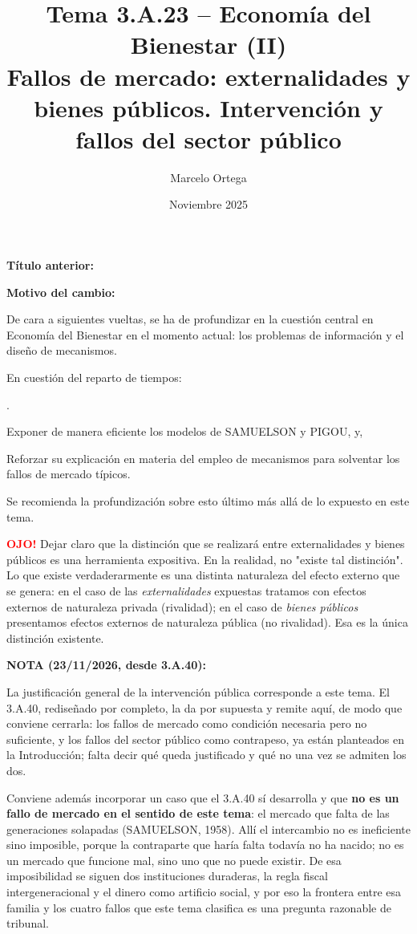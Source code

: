 \documentclass[10pt,a4paper]{article}
\title{Tema 3.A.23 -- Economía del Bienestar (II)\\
\large Fallos de mercado: externalidades y bienes públicos. Intervención y fallos del sector público}
\author{Marcelo Ortega}
\date{Noviembre 2025}
\newcounter{numitem}
\newcommand{\puntosclave}[1]{%
  \begin{tcolorbox}[
    colframe=black,
    title={Puntos clave},
    before upper={\setlength{\parindent}{0.5cm}\setlength{\parskip}{0.5\baselineskip}}
  ]
  #1
  \end{tcolorbox}
}
\newcommand{\modificaciones}[1]{
  \begin{tcolorbox}[
    colback=white,
    colframe=red,
    title={Modificaciones a realizar},
    before upper={\setlength{\parindent}{0.5cm}\setlength{\parskip}{0.5\baselineskip}}
  ]
  #1
  \end{tcolorbox}
}
\newenvironment{lnum}
      {\begin{list}{\arabic{numitem}.}{%
          \usecounter{numitem}%
          \setlength{\leftmargin}{1cm}%
          \setlength{\parskip}{3pt}%
          \setlength{\itemsep}{0pt}%
          \setlength{\parsep}{0pt}%
      }}
      {\end{list}}
\newcommand{\changebox}{%
\begin{tcolorbox}[title={Historial de cambios del tema}]
\textbf{Título anterior:} \OldTitle\par
\textbf{Motivo del cambio:} \ChangeWhy
\end{tcolorbox}
}
\newcommand{\authorfont}[1]{{\fontfamily{EBGaramond-TLF}\selectfont #1}}
\begin{document}
\maketitle
\changebox

\newpage

\puntosclave{
    De cara a siguientes vueltas, se ha de profundizar en la cuestión central en Economía del Bienestar en el momento actual: los problemas de información y el diseño de mecanismos.
    
    En cuestión del reparto de tiempos:
    \begin{lnum}
        \item Exponer de manera eficiente los modelos de \authorfont{SAMUELSON y \authorfont{PIGOU}}, y,
        \item Reforzar su explicación en materia del empleo de mecanismos para solventar los fallos de mercado típicos.
    \end{lnum}
    
    Se recomienda la profundización sobre esto último más allá de lo expuesto en este tema.

    \textcolor{red}{\textbf{OJO!}} Dejar claro que la distinción que se realizará entre externalidades y bienes públicos es una herramienta expositiva. En la realidad, no "existe tal distinción". Lo que existe verdaderarmente es una distinta naturaleza del efecto externo que se genera: en el caso de las \textit{externalidades} expuestas tratamos con efectos externos de naturaleza privada (rivalidad); en el caso de \textit{bienes públicos} presentamos efectos externos de naturaleza pública (no rivalidad). Esa es la única distinción existente. 
    
    }
\vspace{1cm}
\modificaciones{
    \textbf{NOTA (23/11/2026, desde 3.A.40):} {\color{magenta}La justificación general de la intervención pública corresponde a este tema. El 3.A.40, rediseñado por completo, la da por supuesta y remite aquí, de modo que conviene cerrarla: los fallos de mercado como condición necesaria pero no suficiente, y los fallos del sector público como contrapeso, ya están planteados en la Introducción; falta decir qué queda justificado y qué no una vez se admiten los dos.

    Conviene además incorporar un caso que el 3.A.40 sí desarrolla y que \textbf{no es un fallo de mercado en el sentido de este tema}: el mercado que falta de las generaciones solapadas (SAMUELSON, 1958). Allí el intercambio no es ineficiente sino imposible, porque la contraparte que haría falta todavía no ha nacido; no es un mercado que funcione mal, sino uno que no puede existir. De esa imposibilidad se siguen dos instituciones duraderas, la regla fiscal intergeneracional y el dinero como artificio social, y por eso la frontera entre esa familia y los cuatro fallos que este tema clasifica es una pregunta razonable de tribunal.}
    }
\end{document}
